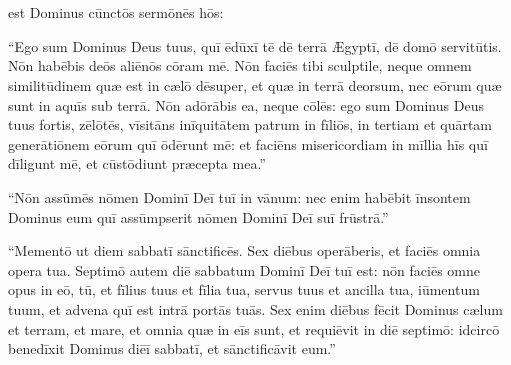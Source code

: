 \chapter{}


\thispagestyle{empty}

 est Dominus cūnctōs sermōnēs hōs: 

``Ego sum Dominus Deus
tuus, quī ēdūxī tē dē terrā Ægyptī, dē domō servitūtis.  Nōn habēbis deōs
aliēnōs cōram mē. Nōn faciēs tibi sculptile, neque omnem
similitūdinem quæ est in cælō dēsuper, et
quæ in terrā deorsum, nec eōrum quæ sunt in aquīs sub terrā. 
Nōn adōrābis
ea, neque cōlēs: ego sum Dominus Deus tuus fortis,
zēlōtēs, vīsitāns
inīquitātem patrum in fīliōs, in tertiam et quārtam
generātiōnem eōrum quī ōdērunt mē:
et faciēns misericordiam in mīllia hīs quī dīligunt mē, et cūstōdiunt
præcepta mea.''

``Nōn assūmēs nōmen
Dominī Deī tuī in vānum: nec enim habēbit
īnsontem Dominus eum quī assūmpserit nōmen Dominī Deī suī
frūstrā.'' 

``Mementō ut diem sabbatī
sānctificēs. 
Sex diēbus operāberis, et
faciēs omnia opera tua. 
Septimō autem diē sabbatum Dominī Deī tuī est:
nōn faciēs omne opus in eō, tū, et fīlius tuus et fīlia tua, servus tuus et
ancilla tua, iūmentum tuum, et advena quī est intrā portās
tuās. 
Sex enim diēbus fēcit Dominus cælum et terram, et mare, et omnia
quæ in eīs sunt, et requiēvit in diē septimō: idcircō benedīxit Dominus diēī
sabbatī, et sānctificāvit eum.''

